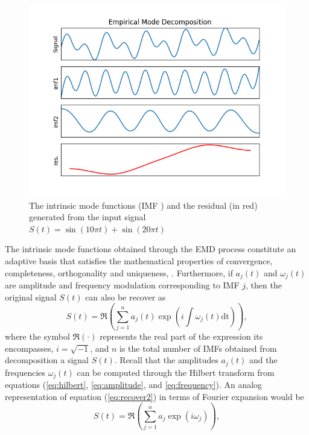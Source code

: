 \documentclass[../Main/thesis.tex]{subfiles}
\begin{document}
\begin{figure}[H] %
   \centering
   \includegraphics[width=6in]{../fig/imfEMD.png} 
   \caption{The intrinsic mode functions (IMF ) and the residual (in red) generated from the input signal $S(t) = \sin(10 \pi t) + \sin(20 \pi t) $}
   \label{fig:emd3}
\end{figure}
\justify
The intrinsic mode functions obtained through the EMD process constitute an adaptive basis that satisfies the mathematical properties of convergence, completeness, orthogonality and uniqueness, \cite{huang98}. Furthermore, if $a_{j}(t)$ and $\omega_{j}(t)$ are amplitude and frequency modulation corresponding to IMF $j$, then the original signal $S(t)$ can also be recover as 
\begin{equation}\label{eq:recover2}
S(t) = \Re{\left( \sum_{j=1}^{n}a_{j}(t)\exp\left(i\int\omega_{j}(t)\mathrm{dt}\right)  \right)},
\end{equation} 
where the symbol $\Re(\cdot)$ represents the real part of the expression its encompasses, $i=\sqrt{-1}$, and $n$ is the total number of IMFs obtained from decomposition a signal $S(t)$. Recall that the amplitudes $a_{j}(t)$ and the frequencies $\omega_{j}(t)$ can be computed through the Hilbert transform from equations (\ref{eq:hilbert}, \ref{eq:amplitude}, and \ref{eq:frequency}). An analog representation of equation (\ref{eq:recover2}) in terms of Fourier expansion would be 
\begin{equation}\label{eq:recoverFourier}
S(t) = \Re{\left( \sum_{j=1}^{n}a_{j}\exp\left(i\omega_{j}\right)  \right)},
\end{equation} 
\end{document}
